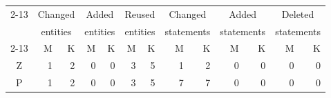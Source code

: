 \begin{tabular}{|c|rr|rr|rr|rr|rr|rr|}
\cmidrule{2-13}
\multicolumn{1}{c|}{} & \multicolumn{2}{c|}{Changed} & \multicolumn{2}{c|}{Added} & \multicolumn{2}{c|}{Reused} & \multicolumn{2}{c|}{Changed} & \multicolumn{2}{c|}{Added} & \multicolumn{2}{c|}{Deleted} \\
\multicolumn{1}{c|}{} & \multicolumn{2}{c|}{entities} & \multicolumn{2}{c|}{entities} & \multicolumn{2}{c|}{entities} & \multicolumn{2}{c|}{statements} & \multicolumn{2}{c|}{statements} & \multicolumn{2}{c|}{statements} \\
\cmidrule{2-13}
\multicolumn{1}{c|}{} & M & K & M & K & M & K & M & K & M & K & M & K \\
\hline
Z & 1 & 2 & 0 & 0 & 3 & 5 & 1 & 2 & 0 & 0 & 0 & 0 \\
\hline
P & 1 & 2 & 0 & 0 & 3 & 5 & 7 & 7 & 0 & 0 & 0 & 0 \\
\hline
\end{tabular}
